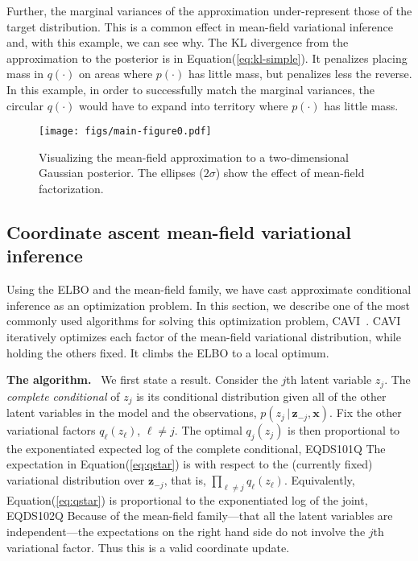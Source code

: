 \documentclass{article}
\DeclareRobustCommand{\parhead}[1]{\textbf{#1}~}
\begin{document}
Further, the marginal variances of the approximation under-represent
those of the target distribution. This is a common effect in
mean-field variational inference and, with this example, we can see
why.  The \gls{KL} divergence from the approximation to the posterior
is in Equation\nobreakspace \textup {(\ref {eq:kl-simple})}.  It penalizes placing mass in $q(\cdot)$ on
areas where $p(\cdot)$ has little mass, but penalizes less the
reverse.  In this example, in order to successfully match the marginal
variances, the circular $q(\cdot)$ would have to expand into territory
where $p(\cdot)$ has little mass.

\begin{figure}[t]
  \centering
  \texttt{[image: figs/main-figure0.pdf]}
  \caption{Visualizing the mean-field approximation to a two-dimensional
  Gaussian posterior. The ellipses ($2\sigma$) show the effect of mean-field
  factorization.}
  \label{fig:accuracy}
\end{figure}

\subsection{Coordinate ascent mean-field variational inference}
\label{sec:cavi}

Using the \gls{ELBO} and the mean-field family, we have cast
approximate conditional inference as an optimization problem.  In this
section, we describe one of the most commonly used algorithms for
solving this optimization problem, \gls{CAVI}~\citep{Bishop:2006}. \gls{CAVI}
iteratively optimizes each
factor of the mean-field variational distribution, while holding the
others fixed.  It climbs the \gls{ELBO} to a local optimum.

\parhead{The algorithm.}  We first state a result.  Consider the
$j$th latent variable $z_j$.  The \emph{complete conditional} of
$z_j$ is its conditional distribution given all of the other latent
variables in the model and the observations,
$p(z_j {\,\vert\,} {\mathbf{z}}_{-j}, {\mathbf{x}})$.  Fix the other variational
factors $q_{\ell}(z_{\ell})$, $\ell \neq j$.  The optimal
$q_{j}(z_j)$ is then proportional to the exponentiated expected log of the
complete conditional,
EQDS101Q
The expectation in Equation\nobreakspace \textup {(\ref {eq:qstar})} is with respect to the (currently
fixed) variational distribution over ${\mathbf{z}}_{-j}$, that is,
$\prod_{\ell \neq j} q_\ell(z_\ell)$. Equivalently, Equation\nobreakspace \textup {(\ref {eq:qstar})} is
proportional to the exponentiated log of the joint,
EQDS102Q
Because of the mean-field family---that all the latent variables are
independent---the expectations on the right hand side do not involve
the $j$th variational factor.  Thus this is a valid coordinate update.
\end{document}
